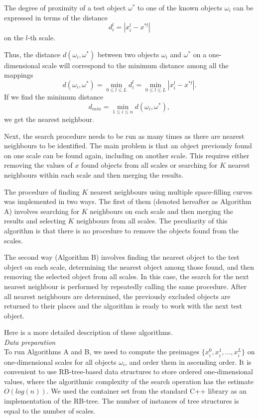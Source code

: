 \documentclass[entropy,article,submit,moreauthors,pdftex]{Definitions/mdpi}
\begin{document}
\begin{paracol}{2}
The degree of proximity of a test object $\omega^*$ to one of the known objects $\omega_i$ can be expressed in terms of the distance
\[
d_i^l = |x_i^l - x^{*l}|
\]
on the $l$-th scale.

Thus, the distance $d(\omega_i,\omega^*)$ between two objects $\omega_i$ and $\omega^*$ on a one-dimensional scale will correspond to the minimum distance among all the mappings 
\[
d(\omega_i,\omega^*) = \min_{0\leq l\leq L} d_i^l = \min_{0\leq l\leq L}  |x_i^l - x^{*l}| .
\]
If we find the minimum distance
\[
d_{min} = \min_{1\leq i\leq n} d(\omega_i,\omega^*) ,
\]
we get the nearest neighbour.

Next, the search procedure needs to be run as many times as there are nearest neighbours to be identified. The main problem is that an object previously found on one scale can be found again, including on another scale. This requires either removing the values of $x$ found objects from all scales or searching for $K$ nearest neighbours within each scale and then merging the results.



The procedure of finding $K$ nearest neighbours using multiple space-filling curves was implemented in two ways. The first of them (denoted hereafter as Algorithm A) involves searching for $K$ neighbours on each scale and then merging the results and selecting $K$ neighbours from all scales. The peculiarity of this algorithm is that there is no procedure to remove the objects found from the scales.

The second way (Algorithm B) involves finding the nearest object to the test object on each scale, determining the nearest object among those found, and then removing the selected object from all scales. In this case, the search for the next nearest neighbour is performed by repeatedly calling the same procedure. After all nearest neighbours are determined, the previously excluded objects are returned to their places and the algorithm is ready to work with the next test object.

Here is a more detailed description of these algorithms.
\\[12pt]
\textit{Data preparation}
\\[12pt]
To run Algorithms A and B, we need to compute the preimages $\{x_i^0, x_i^1, ..., x_i^L\}$ on one-dimensional scales for all objects $\omega_i$, and order them in ascending order. It is convenient to use RB-tree-based data structures to store ordered one-dimensional values,
\textcolor[rgb]{1,0,0}{where the algorithmic complexity of the search operation has the estimate $O(log(n))$. We used the container set from the standard C++ library as an implementation of the RB-tree.}
The number of instances of tree structures is equal to the number of scales.


\end{paracol}
\end{document}

